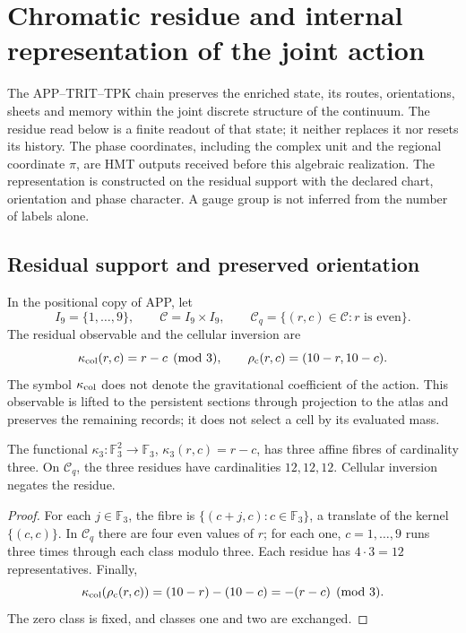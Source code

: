\section{Chromatic residue and internal representation of the joint action}
\label{hmtcuatro:color:seccion}

The APP--TRIT--TPK chain preserves the enriched state, its routes, orientations, sheets and memory within the joint discrete structure of the continuum. The residue read below is a finite readout of that state; it neither replaces it nor resets its history. The phase coordinates, including the complex unit and the regional coordinate \(\pi\), are HMT outputs received before this algebraic realization. The representation is constructed on the residual support with the declared chart, orientation and phase character. A gauge group is not inferred from the number of labels alone.

\subsection{Residual support and preserved orientation}
\label{hmtcuatro:color:residuo}

In the positional copy of APP, let
\[
 I_9=\{1,\ldots,9\},\qquad
 \mathcal C=I_9\times I_9,\qquad
 \mathcal C_q=\{(r,c)\in\mathcal C:r\text{ is even}\}.
\]
The residual observable and the cellular inversion are
\[
 \kappa_{\rm col}(r,c)=r-c\pmod3,\qquad
 \rho_{\rm c}(r,c)=(10-r,10-c).
\]
The symbol \(\kappa_{\rm col}\) does not denote the gravitational coefficient of the action. This observable is lifted to the persistent sections through projection to the atlas and preserves the remaining records; it does not select a cell by its evaluated mass.

\begin{proposition}
\label{hmtcuatro:color:balance} The functional \(\kappa_3:\mathbb F_3^2\to\mathbb F_3\), \(\kappa_3(r,c)=r-c\), has three affine fibres of cardinality three. On \(\mathcal C_q\), the three residues have cardinalities \(12,12,12\). Cellular inversion negates the residue.
\end{proposition}
\begin{proof}
For each \(j\in\mathbb F_3\), the fibre is \(\{(c+j,c):c\in\mathbb F_3\}\), a translate of the kernel \(\{(c,c)\}\). In \(\mathcal C_q\) there are four even values of \(r\); for each one, \(c=1,\ldots,9\) runs three times through each class modulo three. Each residue has \(4\cdot3=12\) representatives. Finally,
\[
 \kappa_{\rm col}(\rho_{\rm c}(r,c))
 =(10-r)-(10-c)=-(r-c)\pmod3.
\]
The zero class is fixed, and classes one and two are exchanged.
\end{proof}

